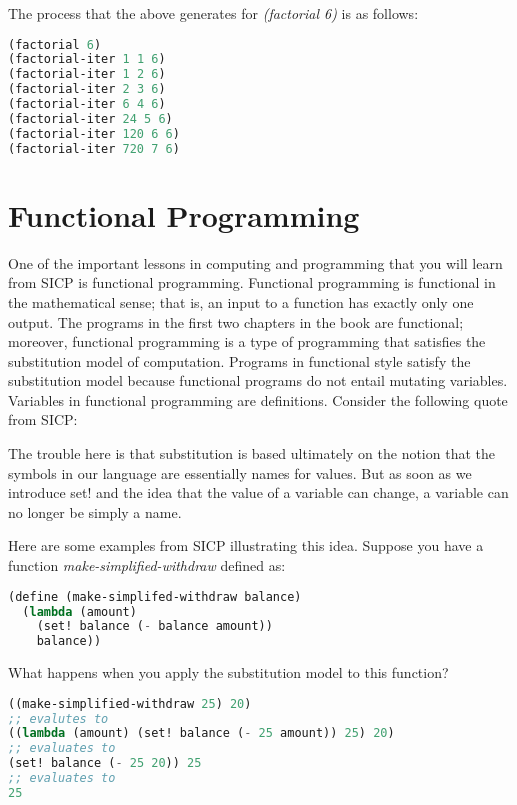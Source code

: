 \documentclass{amsbook}
\begin{document}
The process that the above generates for \textit{(factorial 6)} is as follows:

\begin{lstlisting}[language=Lisp]
(factorial 6)
(factorial-iter 1 1 6)
(factorial-iter 1 2 6)
(factorial-iter 2 3 6)
(factorial-iter 6 4 6)
(factorial-iter 24 5 6)
(factorial-iter 120 6 6)
(factorial-iter 720 7 6)
\end{lstlisting}
\section{Functional Programming}

One of the important lessons in computing and programming that you will learn from SICP is functional programming. Functional programming is functional in the mathematical sense; that is, an input to a function has exactly only one output. The programs in the first two chapters in the book are functional; moreover, functional programming is a type of programming that satisfies the substitution model of computation. Programs in functional style satisfy the substitution model because functional programs do not entail mutating variables. Variables in functional programming are definitions. Consider the following quote from SICP:
\begin{displayquote}
The trouble here is that substitution is based ultimately on the notion that the symbols in our language are essentially names for values. But as soon as we introduce set! and the idea that the value of a variable can change, a variable can no longer be simply a name.
\end{displayquote}

Here are some examples from SICP illustrating this idea. Suppose you have a function \textit{make-simplified-withdraw} defined as:

\begin{lstlisting}[language=Lisp]
(define (make-simplifed-withdraw balance)
  (lambda (amount)
    (set! balance (- balance amount))
    balance))
\end{lstlisting}

What happens when you apply the substitution model to this function?

\begin{lstlisting}[language=Lisp]
((make-simplified-withdraw 25) 20)
;; evalutes to
((lambda (amount) (set! balance (- 25 amount)) 25) 20)
;; evaluates to
(set! balance (- 25 20)) 25
;; evaluates to
25
\end{lstlisting}
\end{document}
